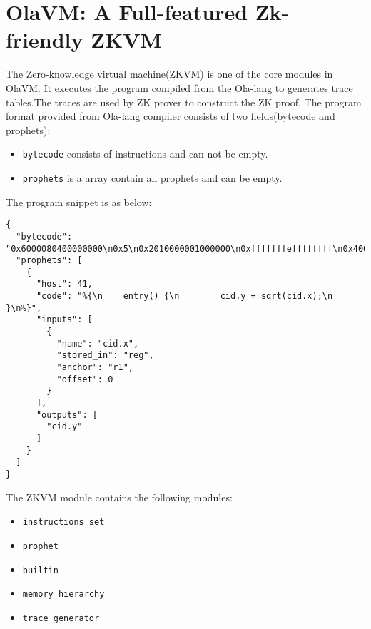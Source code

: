 \section{OlaVM: A Full-featured Zk-friendly ZKVM}\label{sec:ola-vm}
The Zero-knowledge virtual machine(ZKVM) is one of the core modules in OlaVM. It executes the program compiled from the Ola-lang to generates trace tables.The traces are used by ZK prover to construct the ZK proof.
The program format provided from Ola-lang compiler consists of two fields(bytecode and prophets):
\begin{itemize}
    \item \verb|bytecode| consists of instructions and can not be empty.
    \item \verb|prophets| is a array contain all prophets and can be empty.
\end{itemize}

The program snippet is as below:
\begin{lstlisting}[label={lst:program-demo}]
{
  "bytecode": "0x6000080400000000\n0x5\n0x2010000001000000\n0xfffffffeffffffff\n0x4000000840000000\n0x0\n0x0030000001000000\n",
  "prophets": [
    {
      "host": 41,
      "code": "%{\n    entry() {\n        cid.y = sqrt(cid.x);\n    }\n%}",
      "inputs": [
        {
          "name": "cid.x",
          "stored_in": "reg",
          "anchor": "r1",
          "offset": 0
        }
      ],
      "outputs": [
        "cid.y"
      ]
    }
  ]
}
\end{lstlisting}


The ZKVM module contains the following modules:
\begin{itemize}
    \item \verb|instructions set|
    \item \verb|prophet|
    \item \verb|builtin|
    \item \verb|memory hierarchy|
    \item \verb|trace generator|
\end{itemize}





